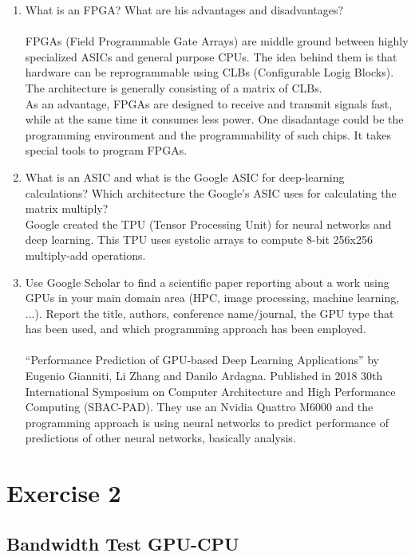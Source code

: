 \documentclass[english]{exam}
\begin{document}
\begin{enumerate}
\item What is an FPGA? What are his advantages and disadvantages?\\\\
  FPGAs (Field Programmable Gate Arrays) are middle ground between highly specialized ASICs and general purpose CPUs. The idea behind them is that hardware can be reprogrammable using CLBs (Configurable Logig Blocks). The architecture is generally consisting of a matrix of CLBs. \\
  As an advantage, FPGAs are designed to receive and transmit signals fast, while at the same time it consumes less power. One disadantage could be the programming environment and the programmability of such chips. It takes special tools to program FPGAs.
  
\item What is an ASIC and what is the Google ASIC for deep-learning calculations? Which architecture the Google's ASIC uses for calculating the matrix multiply? \\
  Google created the TPU (Tensor Processing Unit) for neural networks and deep learning. This TPU uses systolic arrays to compute 8-bit 256x256 multiply-add operations.
  
\item Use Google Scholar to find a scientific paper reporting about a work using GPUs in your main domain area (HPC, image processing, machine learning, ...). Report the title, authors, conference name/journal, the GPU type that has been used, and which programming approach has been employed.\\\\
  ``Performance Prediction of GPU-based Deep Learning Applications'' by Eugenio Gianniti, Li Zhang and Danilo Ardagna. Published in 2018 30th International Symposium on Computer Architecture and High Performance Computing (SBAC-PAD). They use an Nvidia Quattro M6000 and the programming approach is using neural networks to predict performance of predictions of other neural networks, basically analysis.

  
\end{enumerate}

\clearpage

\chapter{Exercise 2}
\section*{Bandwidth Test GPU-CPU}
\end{document}
